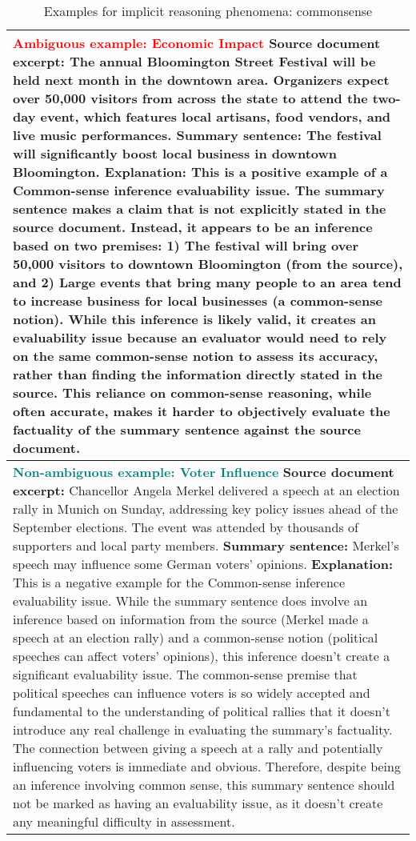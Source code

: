 \begin{table*}
\centering
\small
\begin{tabular}{@{}p{14cm}@{}}
\toprule
\textbf{\textcolor{red}{Ambiguous example: Economic Impact}}
\newline
\textbf{Source document excerpt:}
The annual Bloomington Street Festival will be held next month in the downtown area. Organizers expect over 50,000 visitors from across the state to attend the two-day event, which features local artisans, food vendors, and live music performances.
\newline
\textbf{Summary sentence:}
The festival will significantly boost local business in downtown Bloomington.
\newline
\textbf{Explanation:}
This is a positive example of a Common-sense inference evaluability issue. The summary sentence makes a claim that is not explicitly stated in the source document. Instead, it appears to be an inference based on two premises: 1) The festival will bring over 50,000 visitors to downtown Bloomington (from the source), and 2) Large events that bring many people to an area tend to increase business for local businesses (a common-sense notion). While this inference is likely valid, it creates an evaluability issue because an evaluator would need to rely on the same common-sense notion to assess its accuracy, rather than finding the information directly stated in the source. This reliance on common-sense reasoning, while often accurate, makes it harder to objectively evaluate the factuality of the summary sentence against the source document.
\\
\midrule
\textbf{\textcolor{teal}{Non-ambiguous example: Voter Influence}}
\newline
\textbf{Source document excerpt:}
Chancellor Angela Merkel delivered a speech at an election rally in Munich on Sunday, addressing key policy issues ahead of the September elections. The event was attended by thousands of supporters and local party members.
\newline
\textbf{Summary sentence:}
Merkel’s speech may influence some German voters’ opinions.
\newline
\textbf{Explanation:}
This is a negative example for the Common-sense inference evaluability issue. While the summary sentence does involve an inference based on information from the source (Merkel made a speech at an election rally) and a common-sense notion (political speeches can affect voters’ opinions), this inference doesn’t create a significant evaluability issue. The common-sense premise that political speeches can influence voters is so widely accepted and fundamental to the understanding of political rallies that it doesn’t introduce any real challenge in evaluating the summary’s factuality. The connection between giving a speech at a rally and potentially influencing voters is immediate and obvious. Therefore, despite being an inference involving common sense, this summary sentence should not be marked as having an evaluability issue, as it doesn’t create any meaningful difficulty in assessment.
    \\ 
 \bottomrule
\end{tabular}
\caption{Examples for implicit reasoning phenomena: commonsense}
\label{tab:commonsense_example}
\end{table*}